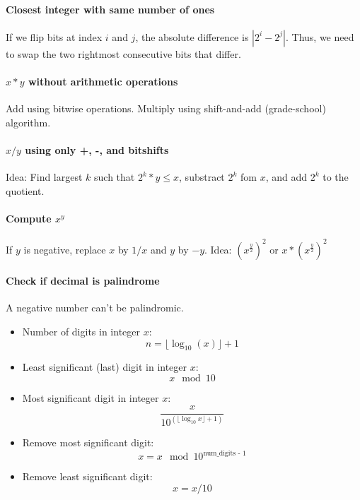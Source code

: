 \documentclass[runningheads]{llncs}
\begin{document}
\paragraph{Closest integer with same number of ones}
If we flip bits at index $i$ and $j$, the absolute difference is $|2^i - 2^j|$.
Thus, we need to swap the two rightmost consecutive bits that differ.

\paragraph{$x*y$ without arithmetic operations}
Add using bitwise operations. Multiply using shift-and-add (grade-school) algorithm.

\paragraph{$x/y$ using only +, -, and bitshifts}
Idea: Find largest $k$ such that $2^k * y \leq x$, substract $2^k$ fom $x$, and add $2^k$ to the quotient.

\paragraph{Compute $x^y$}
If $y$ is negative, replace $x$ by $1/x$ and $y$ by $-y$.
Idea: $(x^\frac{y}{2})^2$ or $x * (x^\frac{y}{2})^2$

\paragraph{Check if decimal is palindrome}
A negative number can't be palindromic.

\begin{itemize}
	\item Number of digits in integer $x$:
$$n = \lfloor \log_10(x) \rfloor + 1$$

	\item Least significant (last) digit in integer $x$:
$$x \mod 10$$

	\item Most significant digit in integer $x$:
$$\frac{x}{10^{(\lfloor \log_10 x \rfloor + 1)}}$$

	\item Remove most significant digit:
$$x = x \mod 10^{\text{num\_digits - 1}}$$

	\item Remove least significant digit:
$$x = x / 10$$
\end{itemize}
\end{document}
